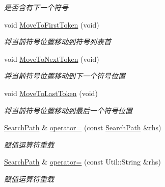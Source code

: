 \begin{DoxyCompactItemize}
\begin{DoxyCompactList}\small\item\em 是否含有下一个符号 \end{DoxyCompactList}\item 
\hypertarget{class_lexer_sys_1_1_search_path_aa5e2c3b515e1b2ca4c4d8cfbc5987c3a}{void \hyperlink{class_lexer_sys_1_1_search_path_aa5e2c3b515e1b2ca4c4d8cfbc5987c3a}{Move\-To\-First\-Token} (void)}\label{class_lexer_sys_1_1_search_path_aa5e2c3b515e1b2ca4c4d8cfbc5987c3a}

\begin{DoxyCompactList}\small\item\em 将当前符号位置移动到符号列表首 \end{DoxyCompactList}\item 
\hypertarget{class_lexer_sys_1_1_search_path_a8db4727a6247e8c8cfac5d04b30270cb}{void \hyperlink{class_lexer_sys_1_1_search_path_a8db4727a6247e8c8cfac5d04b30270cb}{Move\-To\-Next\-Token} (void)}\label{class_lexer_sys_1_1_search_path_a8db4727a6247e8c8cfac5d04b30270cb}

\begin{DoxyCompactList}\small\item\em 将当前符号位置移动到下一个符号位置 \end{DoxyCompactList}\item 
\hypertarget{class_lexer_sys_1_1_search_path_aa7e29634b570628decaa7375a3ee1b33}{void \hyperlink{class_lexer_sys_1_1_search_path_aa7e29634b570628decaa7375a3ee1b33}{Move\-To\-Last\-Token} (void)}\label{class_lexer_sys_1_1_search_path_aa7e29634b570628decaa7375a3ee1b33}

\begin{DoxyCompactList}\small\item\em 将当前符号位置移动到最后一个符号位置 \end{DoxyCompactList}\item 
\hypertarget{class_lexer_sys_1_1_search_path_a53eb16d1e0630183e842c9a8b597b98b}{\hyperlink{class_lexer_sys_1_1_search_path}{Search\-Path} \& \hyperlink{class_lexer_sys_1_1_search_path_a53eb16d1e0630183e842c9a8b597b98b}{operator=} (const \hyperlink{class_lexer_sys_1_1_search_path}{Search\-Path} \&rhs)}\label{class_lexer_sys_1_1_search_path_a53eb16d1e0630183e842c9a8b597b98b}

\begin{DoxyCompactList}\small\item\em 赋值运算符重载 \end{DoxyCompactList}\item 
\hypertarget{class_lexer_sys_1_1_search_path_ab5e4e94635679d471b24b92379957623}{\hyperlink{class_lexer_sys_1_1_search_path}{Search\-Path} \& \hyperlink{class_lexer_sys_1_1_search_path_ab5e4e94635679d471b24b92379957623}{operator=} (const Util\-::\-String \&rhs)}\label{class_lexer_sys_1_1_search_path_ab5e4e94635679d471b24b92379957623}

\begin{DoxyCompactList}\small\item\em 赋值运算符重载 \end{DoxyCompactList}\end{DoxyCompactItemize}

